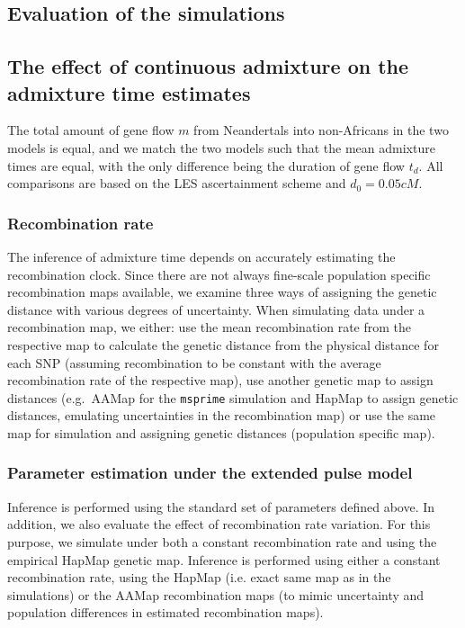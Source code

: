 \subsection{Evaluation of the simulations}

\subsection{The effect of continuous admixture on the admixture time estimates}\label{the effect of continuous admixture on the admixture time estimates}

The total amount of gene flow $m$ from Neandertals into non-Africans
in the two models is equal, and we match the two models such that the mean admixture times are equal, with the only difference being the duration of gene flow $t_d$. All comparisons are based on the LES ascertainment scheme and $d_0 =  0.05 cM$. 



\subsubsection{Recombination rate}
 
The inference of admixture time depends on accurately estimating the recombination clock. Since there are not always fine-scale population specific recombination maps available, we examine three ways of assigning the genetic distance with various degrees of uncertainty. When simulating data under a recombination map, we either: use the mean recombination rate from the
respective map to calculate the genetic distance from the physical
distance for each SNP (assuming recombination to be constant with the average recombination rate of the respective map), use another genetic map to assign distances
(e.g.~AAMap  for the \texttt{msprime} simulation and HapMap  to assign genetic distances, emulating uncertainties in the recombination map) or use the same map for simulation and assigning
genetic distances (population specific map).

\subsubsection{Parameter estimation under the extended pulse model}
Inference is performed using the standard set of parameters defined above. In addition, we also  evaluate the effect of recombination rate variation. For this purpose, we simulate under both a constant recombination rate and using the empirical HapMap genetic map. Inference is performed using either  a constant recombination rate, using the HapMap (i.e. exact same map as in the simulations) or the AAMap recombination maps (to mimic uncertainty and population differences in estimated recombination maps).
